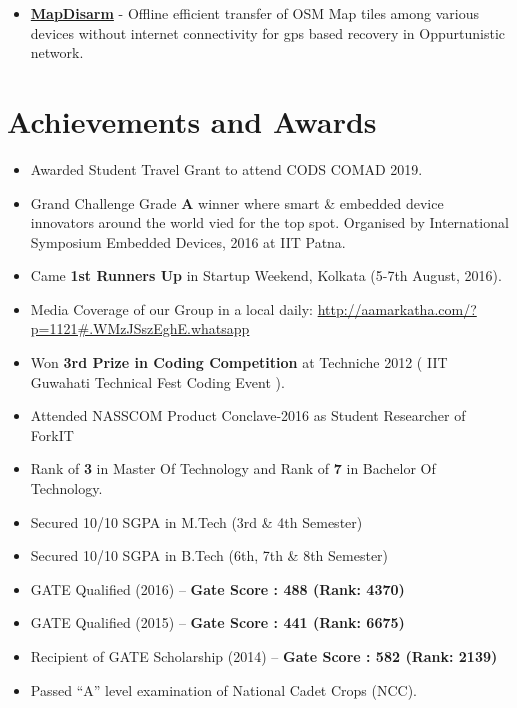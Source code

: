 \documentclass[margin, centered]{res}
\begin{document}
\begin{resume}
\begin{itemize}[leftmargin=*]
 \item \textbf{\href{https://github.com/hridaydutta123/MapDisarm}{MapDisarm}} - Offline efficient transfer of OSM Map tiles among various devices without internet connectivity for gps based recovery in Oppurtunistic network.
\end{itemize}

\section{Achievements and Awards}
\begin{itemize}[leftmargin=*]
 \item Awarded Student Travel Grant to attend CODS COMAD 2019.
 \item Grand Challenge Grade \textbf{A} winner where smart \& embedded device innovators around the world vied for the top spot. Organised by International Symposium Embedded Devices, 2016 at IIT Patna.
 \item Came \textbf{1st Runners Up} in Startup Weekend, Kolkata (5-7th August, 2016).
 \item Media Coverage of our Group in a local daily: \url{http://aamarkatha.com/?p=1121#.WMzJSszEghE.whatsapp}
 \item Won \textbf{3rd Prize in Coding Competition} at Techniche 2012 ( IIT Guwahati Technical Fest Coding Event ).
 \item Attended NASSCOM Product Conclave-2016 as Student Researcher of ForkIT
 \item Rank of \textbf{3} in Master Of Technology and Rank of \textbf{7} in Bachelor Of Technology.
 \item Secured 10/10 SGPA in M.Tech (3rd \& 4th Semester)
 \item Secured 10/10 SGPA in B.Tech (6th, 7th \& 8th Semester)
 \item GATE Qualified (2016) – \textbf{Gate Score : 488 (Rank: 4370) }
 \item GATE Qualified (2015) – \textbf{Gate Score : 441 (Rank: 6675) }
 \item Recipient of GATE Scholarship (2014) – \textbf{Gate Score : 582 (Rank: 2139) }

 \item Passed “A” level examination of National Cadet Crops (NCC).
\end{itemize}



\end{resume}
\end{document}
